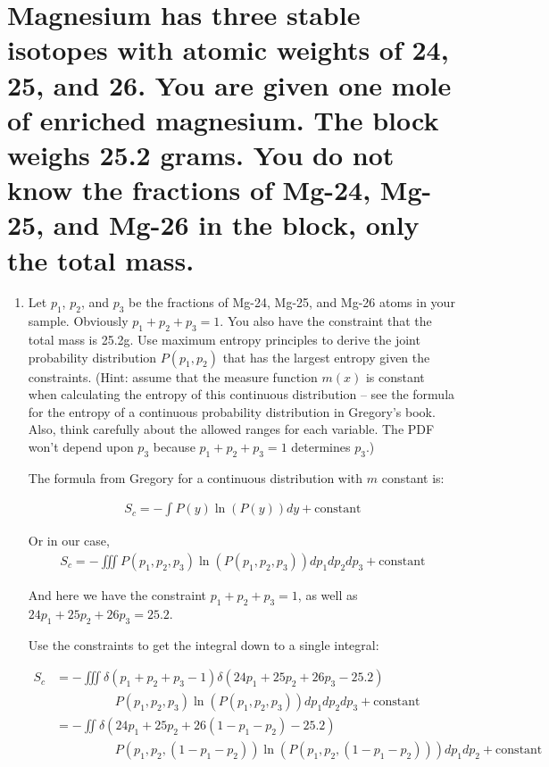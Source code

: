 \section{Magnesium has three stable isotopes with atomic weights of 24, 25, and 26. You are given one mole of enriched magnesium. The block weighs 25.2 grams. You do not know the fractions of Mg-24, Mg-25, and Mg-26 in the block, only the total mass.}

\begin{enumerate}[label=\textbf{\Alph*}.]
    \item Let $p_1$, $p_2$, and $p_3$ be the fractions of Mg-24, Mg-25, and Mg-26 atoms in your sample. Obviously $p_1+p_2+p_3=1$. You also have the constraint that the total mass is 25.2g. Use maximum entropy principles to derive the joint probability distribution $P(p_1,p_2)$ that has the largest entropy given the constraints. (Hint: assume that the measure function $m(x)$ is constant when calculating the entropy of this continuous distribution -- see the formula for the entropy of a continuous probability distribution in Gregory's book. Also, think carefully about the allowed ranges for each variable. The PDF won't depend upon $p_3$ because $p_1+p_2+p_3=1$ determines $p_3$.)

    The formula from Gregory for a continuous distribution with $m$ constant is:

    \begin{align*}
        S_c = -\int P(y) \ln(P(y)) dy + \text{constant}
    \end{align*}

    Or in our case,
    \begin{align*}
        S_c = -\iiint P(p_1, p_2, p_3) \ln(P(p_1, p_2, p_3)) dp_1 dp_2 dp_3 + \text{constant}
    \end{align*}

    And here we have the constraint $p_1+p_2+p_3 = 1$, as well as $24p_1 + 25p_2 + 26p_3 = 25.2$.

    Use the constraints to get the integral down to a single integral:

    \begin{align*}
        S_c &= -\iiint \delta(p_1 + p_2 + p_3 - 1) \delta(24p_1 + 25p_2 + 26p_3 - 25.2) \\
        &\hspace{2cm}P(p_1, p_2, p_3) \ln(P(p_1, p_2, p_3)) dp_1 dp_2 dp_3 + \text{constant} \\
        &= -\iint \delta(24p_1 + 25p_2 + 26(1 - p_1 - p_2) - 25.2) \\
        &\hspace{2cm}P(p_1, p_2, (1 - p_1 - p_2)) \ln(P(p_1, p_2, (1 - p_1 - p_2))) dp_1 dp_2 + \text{constant} \\
    \end{align*}


\end{enumerate}
